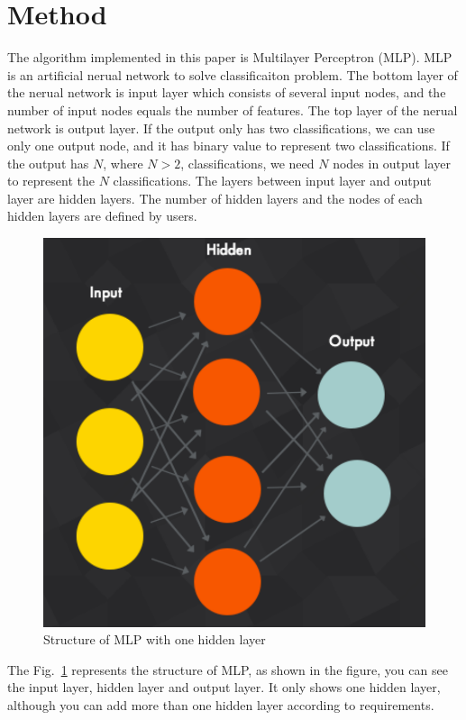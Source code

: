 \documentclass[11pt,letterpaper]{article}
\begin{document}
\section{Method}
The algorithm implemented in this paper is Multilayer Perceptron (MLP). MLP is an artificial nerual network to solve classificaiton problem. The bottom layer of the nerual network is input layer which consists of several input nodes, and the number of input nodes equals the number of features. The top layer of the nerual network is output layer. If the output only has two classifications, we can use only one output node, and it has binary value to represent two classifications. If the output has $N$, where $N>2$, classifications, we need $N$ nodes in output layer to represent the $N$ classifications. The layers between input layer and output layer are hidden layers. The number of hidden layers and the nodes of each hidden layers are defined by users. 
\begin{figure}[H]
\centering
\includegraphics[scale=0.6]{deep.pdf}
\caption{\small Structure of MLP with one hidden layer}
\label{fig:structureOfMLP}
\end{figure}
The Fig.~\ref{fig:structureOfMLP} represents the structure of MLP, as shown in the figure, you can see the input layer, hidden layer and output layer. It only shows one hidden layer, although you can add more than one hidden layer according to requirements. 
\end{document}
